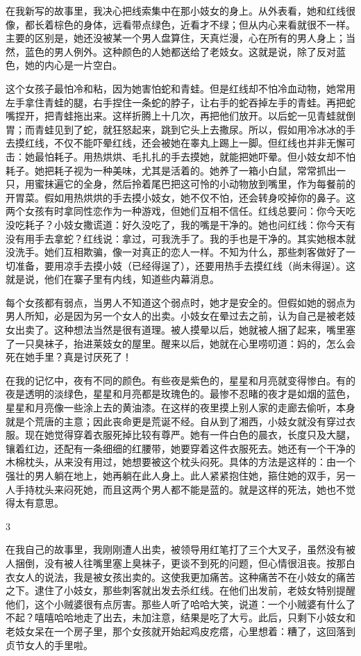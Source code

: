 在我新写的故事里，我决心把线索集中在那小妓女的身上。从外表看，她和红线很像，都长着棕色的身体，远看带点绿色，近看才不绿；但从内心来看就很不一样。主要的区别是，她还没被某一个男人盘算住，天真烂漫，心在所有的男人身上；当然，蓝色的男人例外。这种颜色的人她都送给了老妓女。这就是说，除了反对蓝色，她的内心是一片空白。 

这个女孩子最怕冷和粘，因为她害怕蛇和青蛙。但是红线却不怕冷血动物，她常用左手拿住青蛙的腿，右手捏住一条蛇的脖子，让右手的蛇吞掉左手的青蛙。再把蛇嘴捏开，把青蛙拖出来。这样折腾上十几次，再把他们放开。以后蛇一见青蛙就倒胃；而青蛙见到了蛇，就狂怒起来，跳到它头上去撒尿。所以，假如用冷冰冰的手去摸红线，不仅不能吓晕红线，还会被她在睾丸上踢上一脚。但红线也并非无懈可击：她最怕耗子。用热烘烘、毛扎扎的手去摸她，就能把她吓晕。但小妓女却不怕耗子。她把耗子视为一种美味，尤其是活着的。她养了一箱小白鼠，常常抓出一只，用蜜抹遍它的全身，然后拎着尾巴把这可怜的小动物放到嘴里，作为每餐前的开胃菜。假如用热烘烘的手去摸小妓女，她不仅不怕，还会转身咬掉你的鼻子。这两个女孩有时拿同性恋作为一种游戏，但她们互相不信任。红线总要问：你今天吃没吃耗子？小妓女撒谎道：好久没吃了，我的嘴是干净的。她也问红线：你今天有没有用手去拿蛇？红线说：拿过，可我洗手了。我的手也是干净的。其实她根本就没洗手。她们互相欺骗，像一对真正的恋人一样。不知为什么，那些刺客做好了一切准备，要用凉手去摸小妓（已经得逞了），还要用热手去摸红线（尚未得逞）。这就是说，他们在寨子里有内线，知道些内幕消息。 

每个女孩都有弱点，当男人不知道这个弱点时，她才是安全的。但假如她的弱点为男人所知，必是因为另一个女人的出卖。小妓女在晕过去之前，认为自己是被老妓女出卖了。这种想法当然是很有道理。被人摸晕以后，她就被人捆了起来，嘴里塞了一只臭袜子，抬进莱妓女的屋里。醒来以后，她就在心里唠叨道：妈的，怎么会死在她手里？真是讨厌死了！ 

在我的记忆中，夜有不同的颜色。有些夜是紫色的，星星和月亮就变得惨白。有的夜是透明的淡绿色，星星和月亮都是玫瑰色的。最惨不忍睹的夜才是如烟的蓝色，星星和月亮像一些涂上去的黄油漆。在这样的夜里摸上别人家的走廊去偷听，本身就是个荒唐的主意；因此丧命更是荒诞不经。自从到了湘西，小妓女就没有穿过衣服。现在她觉得穿着衣服死掉比较有尊严。她有一件白色的晨衣，长度只及大腿，镶着红边，还配有一条细细的红腰带，她要穿着这件衣服死去。她还有一个干净的木棉枕头，从来没有用过，她想要被这个枕头闷死。具体的方法是这样的：由一个强壮的男人躺在地上，她再躺在此人身上。此人紧紧抱住她，箍住她的双手，另一人手持枕头来闷死她，而且这两个男人都不能是蓝的。就是这样的死法，她也不觉得太有意思。 

3 

在我自己的故事里，我刚刚遭人出卖，被领导用红笔打了三个大叉子，虽然没有被人捆倒，没有被人往嘴里塞上臭袜子，更谈不到死的问题，但心情很沮丧。按那白衣女人的说法，我是被女孩出卖的。这使我更加痛苦。这种痛苦不在小妓女的痛苦之下。逮住了小妓女，那些刺客就出发去杀红线。在他们出发前，老妓女特别提醒他们，这个小贼婆很有点厉害。那些人听了哈哈大笑，说道：一个小贼婆有什么了不起？嘻嘻哈哈地走了出去，未加注意，结果是吃了大亏。此后，只剩下小妓女和老妓女呆在一个房子里，那个女孩就开始起鸡皮疙瘩，心里想着：糟了，这回落到贞节女人的手里啦。 

